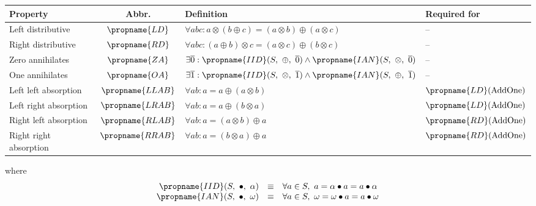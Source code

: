 \begin{tabular}{lcll}
\toprule
Property & Abbr. & Definition & Required for \\
\midrule
Left distributive	& $\propname{LD}$	& $\forall a b c : a\otimes(b \oplus c) =  (a\otimes b) \oplus (a\otimes c)$ & -- \\
Right distributive	& $\propname{RD}$	& $\forall a b c : (a\oplus b)\otimes c  =   (a\otimes c) \oplus (b\otimes c)$ & -- \\
Zero annihilates	& $\propname{ZA}$	& $\exists \overline{0} : \propname{IID}(S,\ \oplus,\ \overline{0}) \wedge \propname{IAN}(S,\ \otimes,\ \overline{0})$ & -- \\
One annihilates		& $\propname{OA}$	& $\exists \overline{1} : \propname{IID}(S,\ \otimes,\ \overline{1}) \wedge \propname{IAN}(S,\ \oplus,\ \overline{1})$ & -- \\
\midrule
Left left absorption 	& $\propname{LLAB}$ 	& $\forall a b : a = a \oplus (a \otimes b)$ & $\propname{LD}(\mathrm{AddOne})$ \\
Left right absorption 	& $\propname{LRAB}$ 	& $\forall a b : a = a \oplus (b \otimes a)$ & $\propname{LD}(\mathrm{AddOne})$ \\
Right left absorption 	& $\propname{RLAB}$ 	& $\forall a b : a = (a \otimes b) \oplus a$ & $\propname{RD}(\mathrm{AddOne})$ \\
Right right absorption 	& $\propname{RRAB}$ 	& $\forall a b : a = (b \otimes a) \oplus a$ & $\propname{RD}(\mathrm{AddOne})$ \\
\bottomrule
\end{tabular}

\vspace{1em}

where 
\[ 
\begin{array}{rcl} 
\propname{IID}(S,\ \bullet,\ \alpha)  
    & \equiv 
    & \forall a\in S,\ a = \alpha \bullet a = a \bullet \alpha\\ 
\propname{IAN}(S,\ \bullet,\ \omega)  
    & \equiv 
    & \forall a\in S,\ \omega = \omega \bullet a = a \bullet \omega\\ 
\end{array} 
\] 
